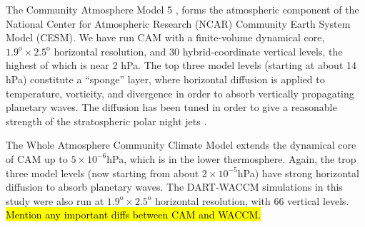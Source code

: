 The Community Atmosphere Model 5 \citep[CAM5]{nealeetal2010}, forms the atmospheric component of the National Center for Atmospheric Research (NCAR) Community Earth System Model (CESM). 
We have run CAM with a finite-volume dynamical core, $1.9^{\text{o}} \times 2.5^{\text{o}}$ horizontal resolution, and  30 hybrid-coordinate vertical levels, the highest of which is near 2 hPa.
The top three model levels (starting at about 14 hPa) constitute a ``sponge'' layer, where horizontal diffusion is applied to temperature, vorticity, and divergence in order to absorb vertically propagating planetary waves.  
The diffusion has been tuned in order to give a reasonable strength of the stratospheric polar night jets \citep{nealeetal2010}.

The Whole Atmosphere Community Climate Model \citep[WACCM]{Marsh2013} extends the dynamical core of CAM up to $5 \times 10^{-6}$hPa, which is in the lower thermosphere. 
Again, the trop three model levels (now starting from about $2 \times 10^{-5}$hPa) have strong horizontal diffusion to absorb planetary waves. 
The DART-WACCM simulations in this study were also run at $1.9^{\text{o}} \times 2.5^{\text{o}}$ horizontal resolution, with 66 vertical levels. 
\hl{Mention any important diffs between CAM and WACCM.}

